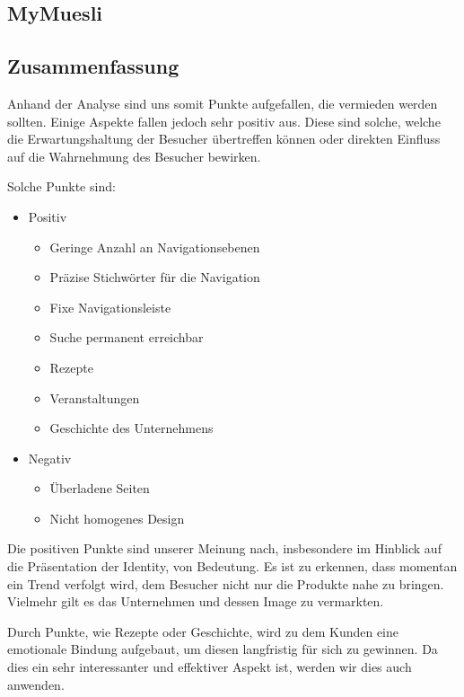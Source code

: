 \documentclass[12pt,a4paper,oneside,ngerman]{article}
\begin{document}
\subsection{MyMuesli} %

\subsection{Zusammenfassung}
Anhand der Analyse sind uns somit Punkte aufgefallen, die vermieden werden sollten. Einige Aspekte fallen jedoch sehr positiv aus. Diese sind solche, welche die Erwartungshaltung der Besucher übertreffen können oder direkten Einfluss auf die Wahrnehmung des Besucher bewirken.

Solche Punkte sind:
\begin{itemize}

\item{Positiv}
\begin{itemize} %
\item{Geringe Anzahl an Navigationsebenen}
\item{Präzise Stichwörter für die Navigation}
\item{Fixe Navigationsleiste}
\item{Suche permanent erreichbar}
\item{Rezepte}
\item{Veranstaltungen}
\item{Geschichte des Unternehmens}
\end{itemize}

\item{Negativ}
\begin{itemize} %
\item{Überladene Seiten}
\item{Nicht homogenes Design}
\end{itemize}

\end{itemize}

Die positiven Punkte sind unserer Meinung nach, insbesondere im Hinblick auf die Präsentation der Identity, von Bedeutung. Es ist zu erkennen, dass momentan ein Trend verfolgt wird, dem Besucher nicht nur die Produkte nahe zu bringen. Vielmehr gilt es das Unternehmen und dessen Image zu vermarkten. 

Durch Punkte, wie Rezepte oder Geschichte, wird zu dem Kunden eine emotionale Bindung aufgebaut, um diesen langfristig für sich zu gewinnen. Da dies ein sehr interessanter und effektiver Aspekt ist, werden wir dies auch anwenden.
\end{document}
